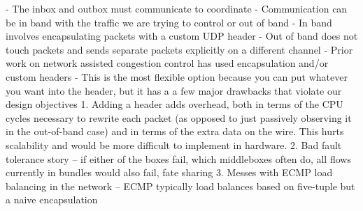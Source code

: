 - The inbox and outbox must communicate to coordinate
- Communication can be in band with the traffic we are trying to control or out of band
    - In band involves encapsulating packets with a custom UDP header
    - Out of band does not touch packets and sends separate packets explicitly on a different channel
- Prior work on network assisted congestion control has used encapsulation and/or custom headers 
- This is the most flexible option because you can put whatever you want into the header, but it has a 
a few major drawbacks that violate our design objectives
    1. Adding a header adds overhead, both in terms of the CPU cycles necessary to rewrite each packet
    (as opposed to just passively observing it in the out-of-band case) and in terms of the extra data
    on the wire. This hurts scalability and would be more difficult to implement in hardware.
    2. Bad fault tolerance story -- if either of the boxes fail, which middleboxes often do, 
    all flows currently in bundles would also fail, fate sharing
    3. Messes with ECMP load balancing in the network -- ECMP typically load balances based on five-tuple
    but a naive encapsulation 